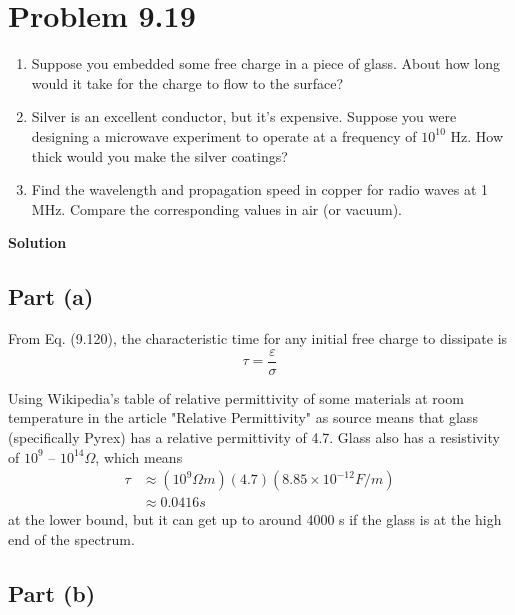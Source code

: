 \documentclass[12pt]{article}
\newcommand{\enterProblemHeader}[1]{
	\rhead{#1}
}
\newenvironment{homeworkProblem}[1]{
    \section{Problem #1}
    \enterProblemHeader{#1}
}{
	\pagebreak
}
\newcommand{\solution}{\textbf{\large Solution}}
\begin{document}
\begin{homeworkProblem}{9.19}
	\renewcommand{\theenumi}{\alph{enumi}}
	\renewcommand{\labelenumi}{(\theenumi)}
	\begin{enumerate}
		\item Suppose you embedded some free charge in a piece of glass. About
		how long would it take for the charge to flow to the surface?
		\item Silver is an excellent conductor, but it's expensive. Suppose you
		were designing a microwave experiment to operate at a frequency of
		$10^{10}$ Hz. How thick would you make the silver coatings?
		\item Find the wavelength and propagation speed in copper for radio
		waves at 1 MHz. Compare the corresponding values in air (or vacuum).
	\end{enumerate}

	\solution

	\subsection{Part (a)}

	From Eq.
	(9.120), the characteristic time for any initial free charge to dissipate is
	\[
		\tau = \frac \varepsilon \sigma
	\]

	Using Wikipedia's table of relative permittivity of some materials at room
	temperature in the article "Relative Permittivity" as source means that
	glass (specifically Pyrex) has a relative permittivity of 4.7. Glass also
	has a resistivity of $10^9$ -- $10^14\Omega$, which means
	\begin{align*}
		\tau &\approx \left( 10^9 \si{\Omega m} \right) (4.7) \left( 8.85 \times
		10^{-12} \si{F/m} \right)\\
		&\approx 0.0416 \si{s}
	\end{align*}
	at the lower bound, but it can get up to around 4000 s if the glass is at
	the high end of the spectrum.

	\subsection{Part (b)}


\end{homeworkProblem}
\end{document}
